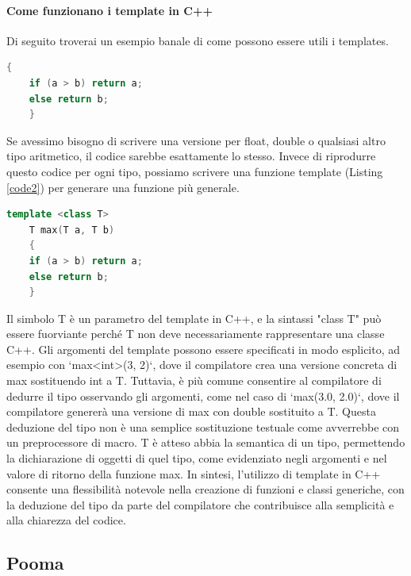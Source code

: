 \documentclass[11pt]{article}
\begin{document}
\begin{multicols*}{2}[\columnsep=1cm]
    \paragraph{Come funzionano i template in C++}
    Di seguito troverai un esempio banale di come possono essere utili i templates.
    \begin{lstlisting}[language=C++, label=code1, caption={Max function without template}]
    {
    if (a > b) return a;
    else return b;
    }
    \end{lstlisting}
    Se avessimo bisogno di scrivere una versione per float, double o qualsiasi altro tipo aritmetico, il codice sarebbe esattamente lo stesso. Invece di riprodurre questo codice per ogni tipo, possiamo scrivere una funzione template (Listing \ref{code2}) per generare una funzione più generale.
    
    \begin{lstlisting}[language=C++, label=code2, caption={Max function with template}]
    template <class T>
    T max(T a, T b)
    {
    if (a > b) return a;
    else return b;
    }
    \end{lstlisting}
    
    Il simbolo T è un parametro del template in C++, e la sintassi "class T" può essere fuorviante perché T non deve necessariamente rappresentare una classe C++. Gli argomenti del template possono essere specificati in modo esplicito, ad esempio con `max<int>(3, 2)`, dove il compilatore crea una versione concreta di max sostituendo int a T. Tuttavia, è più comune consentire al compilatore di dedurre il tipo osservando gli argomenti, come nel caso di `max(3.0, 2.0)`, dove il compilatore genererà una versione di max con double sostituito a T.
    Questa deduzione del tipo non è una semplice sostituzione testuale come avverrebbe con un preprocessore di macro. T è atteso abbia la semantica di un tipo, permettendo la dichiarazione di oggetti di quel tipo, come evidenziato negli argomenti e nel valore di ritorno della funzione max. In sintesi, l'utilizzo di template in C++ consente una flessibilità notevole nella creazione di funzioni e classi generiche, con la deduzione del tipo da parte del compilatore che contribuisce alla semplicità e alla chiarezza del codice.

    \subsection{Pooma}

\end{multicols*}
\end{document}
